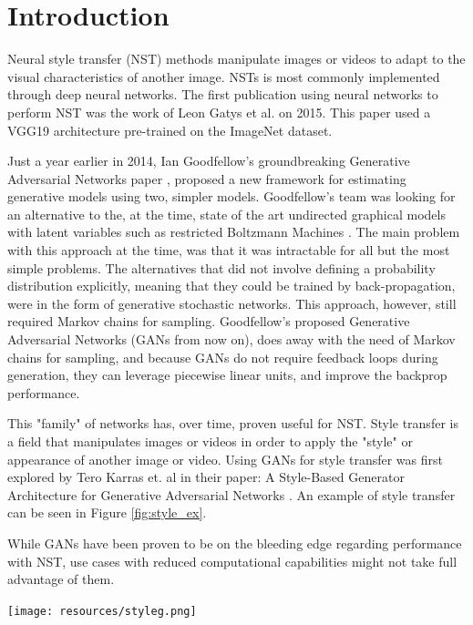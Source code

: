\documentclass[journal,onecolumn]{IEEEtran}
\newenvironment{Figure}
  {\par\medskip\noindent\minipage{\linewidth}}
  {\endminipage\par\medskip}
\begin{document}
\section{Introduction}

Neural style transfer (NST) methods manipulate images or videos to adapt to the visual characteristics of another image. NSTs is most commonly implemented through deep neural networks. The first publication using neural networks to perform NST was the work of Leon Gatys et al.\cite{DBLP:journals/corr/GatysEB15a} on 2015. This paper used a VGG19 architecture pre-trained on the ImageNet dataset. 


Just a year earlier in 2014, Ian Goodfellow's groundbreaking Generative Adversarial Networks paper \cite{goodfellow2014generative}, proposed a new framework for estimating generative models using two, simpler models. Goodfellow's team was looking for an alternative to the, at the time, state of the art undirected graphical models with latent variables such as restricted Boltzmann Machines \cite{computation_2021, rumelhart86a}. The main problem with this approach at the time, was that it was intractable for all but the most simple problems. The alternatives that did not involve defining a probability distribution explicitly, meaning that they could be trained by back-propagation, were in the form of generative stochastic networks\cite{DBLP:journals/corr/BengioT13}. This approach, however, still required Markov chains for sampling. Goodfellow's proposed Generative Adversarial Networks (GANs from now on), does away with the need of Markov chains for sampling, and because GANs do not require feedback loops during generation, they can leverage piecewise linear units, and improve the backprop performance.

This "family" of networks has, over time, proven useful for NST. Style transfer is a field that manipulates images or videos in order to apply the "style" or appearance of another image or video. Using GANs for style transfer was first explored by Tero Karras et. al in their paper: A Style-Based Generator Architecture for Generative Adversarial Networks \cite{stylegan}. An example of style transfer can be seen in Figure \ref{fig:style_ex}.

While GANs have been proven to be on the bleeding edge regarding performance with NST, use cases with reduced computational capabilities might not take full advantage of them.

\begin{Figure}
 \centering
 \texttt{[image: resources/styleg.png]}
 \label{fig:style_ex}
\end{Figure}
\end{document}

